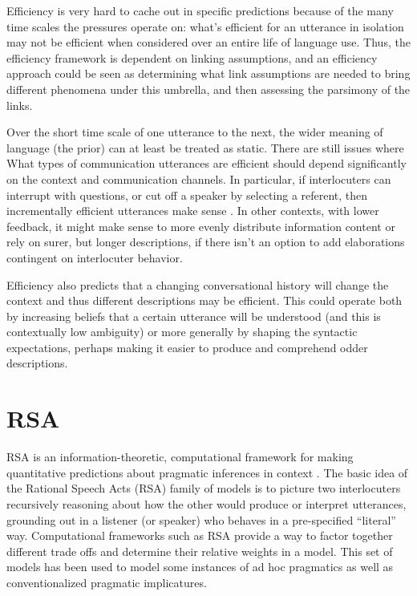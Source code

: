 \documentclass[]{article}
\begin{document}
Efficiency is very hard to cache out in specific predictions because of the many time scales the pressures operate on: what's efficient for an utterance in isolation may not be efficient when considered over an entire life of language use. Thus, the efficiency framework is dependent on linking assumptions, and an efficiency approach could be seen as determining what link assumptions are needed to bring different phenomena under this umbrella, and then assessing the parsimony of the links.

Over the short time scale of one utterance to the next, the wider meaning of language (the prior) can at least be treated as static. There are still issues where What types of communication utterances are efficient should depend significantly on the context and communication channels. In particular, if interlocuters can interrupt with questions, or cut off a speaker by selecting a referent, then incrementally efficient utterances make sense \cite{gibson2019}. In other contexts, with lower feedback, it might make sense to more evenly distribute information content or rely on surer, but longer descriptions, if there isn't an option to add elaborations contingent on interlocuter behavior.

Efficiency also predicts that a changing conversational history will change the context and thus different descriptions may be efficient. This could operate both by increasing beliefs that a certain utterance will be understood (and this is contextually low ambiguity) or more generally by shaping the syntactic expectations, perhaps making it easier to produce and comprehend odder descriptions. 

\section{RSA}

RSA is an information-theoretic, computational framework for making quantitative predictions about pragmatic inferences in context \cite{goodman2016, frank2012a}. The basic idea of the Rational Speech Acts (RSA) family of models is to picture two interlocuters recursively reasoning about how the other would produce or interpret utterances, grounding out in a listener (or speaker) who behaves in a pre-specified ``literal'' way. Computational frameworks such as RSA provide a way to factor together different trade offs and determine their relative weights in a model. This set of models has been used to model some instances of ad hoc pragmatics as well as conventionalized pragmatic implicatures. 
\end{document}
